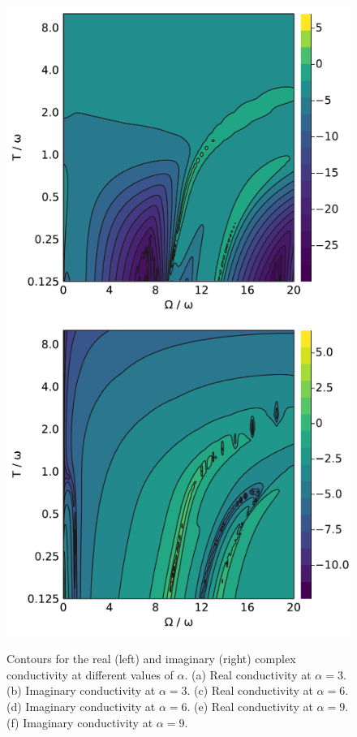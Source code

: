 \begin{figure}[p]
    \includegraphics[width=.49\textwidth]{figures/conductivity_contour_real_9.pdf}
    \includegraphics[width=.49\textwidth]{figures/conductivity_contour_imag_9.pdf}

    \caption{Contours for the real (left) and imaginary (right) complex conductivity at different values of $\alpha$. (a) Real conductivity at $\alpha = 3$. (b) Imaginary conductivity at $\alpha = 3$. (c) Real conductivity at $\alpha = 6$. (d) Imaginary conductivity at $\alpha = 6$. (e) Real conductivity at $\alpha = 9$. (f) Imaginary conductivity at $\alpha = 9$.}
    \label{fig:osakacontour}
\end{figure}

